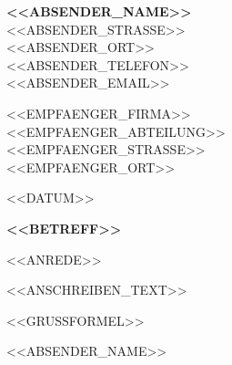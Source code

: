 \documentclass[11pt, a4paper]{article}
\begin{document}
\color{darkgray}

\begin{flushleft}
{\large\bfseries <<ABSENDER_NAME>>}\\[2pt]
{}<<ABSENDER_STRASSE>>\\
{}<<ABSENDER_ORT>>\\[2pt]
{}<<ABSENDER_TELEFON>>\\
{}<<ABSENDER_EMAIL>>
\end{flushleft}

\vspace{8mm}

\begin{flushleft}
{}<<EMPFAENGER_FIRMA>>\\
{}<<EMPFAENGER_ABTEILUNG>>\\
{}<<EMPFAENGER_STRASSE>>\\
{}<<EMPFAENGER_ORT>>
\end{flushleft}

\vspace{6mm}

\begin{flushright}
<<DATUM>>
\end{flushright}

\vspace{4mm}

{\large\bfseries\color{accentblue} <<BETREFF>>}

\vspace{6mm}

<<ANREDE>>

\vspace{2mm}

<<ANSCHREIBEN_TEXT>>

\vspace{4mm}

<<GRUSSFORMEL>>

\vspace{8mm}

<<ABSENDER_NAME>>
\end{document}
